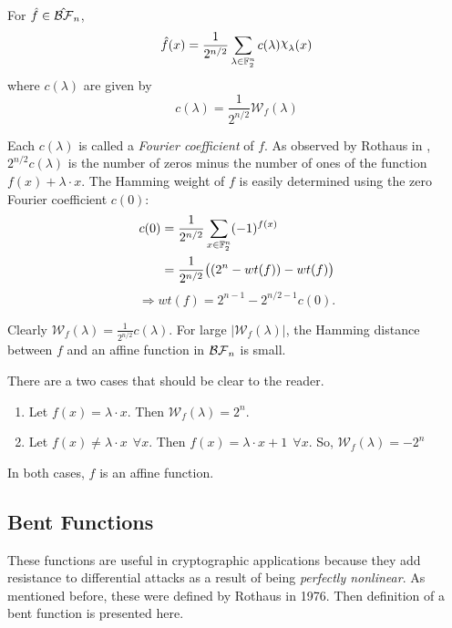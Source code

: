 \begin{lemma}
  For $\hat{f}\in\hat{\mathcal{BF}}_n$,
\begin{equation}\label{eqn:rewrite-pseudo}
	\hat{f}(x)
    =\frac{1}{2^{n/2}}
      \sum_{\lambda\in\gftwo^n}c(\lambda)\Chi_\lambda(x)
\end{equation}
	where $c(\lambda)$ are given by
  \begin{equation}\label{eqn:clambda}
    c(\lambda)=\frac{1}{2^{n/2}}\mathcal{W}_f(\lambda)
  \end{equation}
\end{lemma}

\par Each $c(\lambda)$ is called a \textit{Fourier coefficient} of $f$.
As observed by Rothaus in \cite{art:r76}, $2^{n/2}c(\lambda)$ is the
number of zeros minus the number of ones of the function
$f(x)+\lambda\cdot x$. The Hamming weight of $f$ is easily determined using
the zero Fourier coefficient $c(0)$:
\begin{align*}
	c(0)&=\frac{1}{2^{n/2}}\sum_{x\in\mathbb{F}_2^n}(-1)^{f(x)}\\
	&=\frac{1}{2^{n/2}}\big((2^n-wt(f))-wt(f)\big)
\end{align*}
\begin{equation}
  \Rightarrow wt(f)=2^{n-1}-2^{n/2-1}c(0).
\end{equation}

\par Clearly $\mathcal{W}_f(\lambda)=\frac{1}{2^{n/2}}c(\lambda)$. For large
$|\mathcal{W}_f(\lambda)|$, the Hamming distance between $f$ and an affine
function in $\mathcal{BF}_n$ is small.

\begin{example}
  There are a two cases that should be clear to the reader.
  \begin{enumerate}[1.]
    \item Let $f(x)=\lambda\cdot x$. Then $\mathcal{W}_f(\lambda)=2^n$.
    \item Let $f(x)\not=\lambda\cdot x \ \ \forall x$. Then $f(x)=
      \lambda\cdot x+1 \ \ \forall x$. So, $\mathcal{W}_f(\lambda)=-2^n$
  \end{enumerate}
  In both cases, $f$ is an affine function.
\end{example}

\subsection{Bent Functions}
\par These functions are useful in cryptographic applications because they
add resistance to differential attacks as a result of being \textit{perfectly
nonlinear}. As mentioned before, these were defined by Rothaus in 1976. Then
definition of a bent function is presented here.


